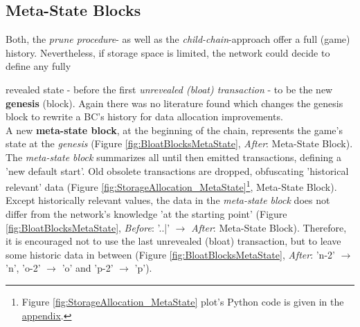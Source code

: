 \subsection{Meta-State Blocks}
\label{sec:MeatState}
Both, the \textit{prune procedure}- as well as the \textit{child-chain}-approach offer a full (game) history.
Nevertheless, if storage space is limited, the network could decide to define any fully
\begin{figure}[!b]
\end{figure}
revealed state - before the first \textit{unrevealed (bloat) transaction} - to be the new \textbf{genesis} (block).
Again there was no literature found which changes the genesis block to rewrite a \gls{BC}'s history for data allocation improvements. \\
A new \textbf{meta-state block}, at the beginning of the chain, represents the game's state at the \textit{genesis}
(Figure \ref{fig:BloatBlocksMetaState}, \textit{After}: Meta-State Block).
The \textit{meta-state block} summarizes all until then emitted transactions, defining a 'new default start'.
Old obsolete transactions are dropped, obfuscating 'historical relevant' data (Figure \ref{fig:StorageAllocation_MetaState}\footnote{\hspace{0.1cm}Figure \ref{fig:StorageAllocation_MetaState} plot's Python code is given in the \hyperref[script:StorageAllocationMetaState]{appendix}.}, Meta-State Block).
Except historically relevant values, the data in the \textit{meta-state block} does not differ from the network's knowledge 'at the starting point' (Figure \ref{fig:BloatBlocksMetaState}, \textit{Before}: '..|' $\to$ \textit{After}: Meta-State Block).
Therefore, it is encouraged not to use the last unrevealed (bloat) transaction, but to leave some historic data in between (Figure \ref{fig:BloatBlocksMetaState}, \textit{After}: 'n-2' $\to$ 'n', 'o-2' $\to$ 'o' and 'p-2' $\to$ 'p').
\begin{figure}
\end{figure}

